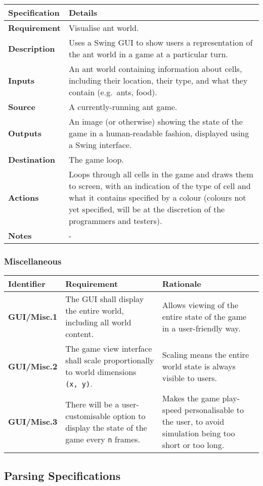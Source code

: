 \documentclass[11pt]{article}
\begin{document}
\begin{longtable}[c]{@{\extracolsep{\fill}}|p{}|p{}|@{}}
\hline
Specification & Details\tabularnewline
\hline

\textbf{Requirement} & Visualise ant world.\tabularnewline
\textbf{Description} & Uses a Swing GUI to show users a representation
of the ant world in a game at a particular turn.\tabularnewline
\textbf{Inputs} & An ant world containing information about cells,
including their location, their type, and what they contain (e.g.~ants,
food).\tabularnewline
\textbf{Source} & A currently-running ant game.\tabularnewline
\textbf{Outputs} & An image (or otherwise) showing the state of the game
in a human-readable fashion, displayed using a Swing
interface.\tabularnewline
\textbf{Destination} & The game loop.\tabularnewline
\textbf{Actions} & Loops through all cells in the game and draws them to
screen, with an indication of the type of cell and what it contains
specified by a colour (colours not yet specified, will be at the
discretion of the programmers and testers).\tabularnewline
\textbf{Notes} & -\tabularnewline
\hline
\end{longtable}

\subsubsection*{Miscellaneous}\label{miscellaneous-3}

\begin{longtable}[c]{|p{}|p{}|p{}|}
\hline
Identifier & Requirement & Rationale\tabularnewline
\hline

\textbf{GUI/Misc.1} & The GUI shall display the entire world, including
all world content. & Allows viewing of the entire state of the game in a
user-friendly way.\tabularnewline
\textbf{GUI/Misc.2} & The game view interface shall scale proportionally
to world dimensions \texttt{(x,\ y)}. & Scaling means the entire world
state is always visible to users.\tabularnewline
\textbf{GUI/Misc.3} & There will be a user-customisable option to
display the state of the game every \texttt{n} frames. & Makes the game
play-speed personalisable to the user, to avoid simulation being too
short or too long.\tabularnewline
\hline
\end{longtable}

\subsection{Parsing Specifications}\label{parsing-specifications}
\end{document}
